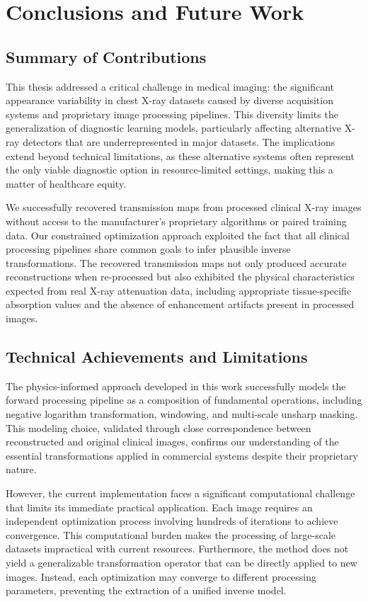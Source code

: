 \documentclass[nomenclature, english, bibtex]{kththesis}
\numberwithin{listing}{chapter}
\begin{document}
\cleardoublepage
\chapter{Conclusions and Future Work}
\label{ch:conclusionsAndFutureWork}

\section{Summary of Contributions}

This thesis addressed a critical challenge in medical imaging: the significant appearance variability in chest X-ray datasets caused by diverse acquisition systems and proprietary image processing pipelines. This diversity limits the generalization of diagnostic learning models, particularly affecting alternative X-ray detectors that are underrepresented in major datasets. The implications extend beyond technical limitations, as these alternative systems often represent the only viable diagnostic option in resource-limited settings, making this a matter of healthcare equity.

We successfully recovered transmission maps from processed clinical X-ray images without access to the manufacturer's proprietary algorithms or paired training data. Our constrained optimization approach exploited the fact that all clinical processing pipelines share common goals to infer plausible inverse transformations. The recovered transmission maps not only produced accurate reconstructions when re-processed but also exhibited the physical characteristics expected from real X-ray attenuation data, including appropriate tissue-specific absorption values and the absence of enhancement artifacts present in processed images.


\section{Technical Achievements and Limitations}

The physics-informed approach developed in this work successfully models the forward processing pipeline as a composition of fundamental operations, including negative logarithm transformation, windowing, and multi-scale unsharp masking. This modeling choice, validated through close correspondence between reconstructed and original clinical images, confirms our understanding of the essential transformations applied in commercial systems despite their proprietary nature.

However, the current implementation faces a significant computational challenge that limits its immediate practical application. Each image requires an independent optimization process involving hundreds of iterations to achieve convergence. This computational burden makes the processing of large-scale datasets impractical with current resources. Furthermore, the method does not yield a generalizable transformation operator that can be directly applied to new images. Instead, each optimization may converge to different processing parameters, preventing the extraction of a unified inverse model.
\end{document}
